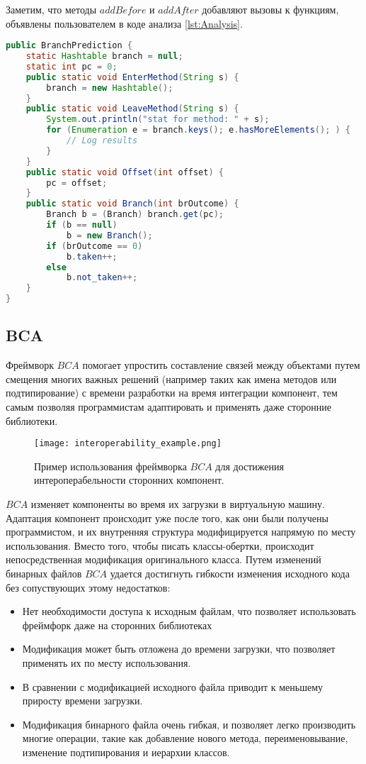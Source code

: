 Заметим, что методы $addBefore$ и $addAfter$ добавляют вызовы к функциям, объявлены пользователем в коде анализа \autoref{lst:Analysis}.

\begin{lstlisting}[language=Java, caption=Подсчет условных переходов на $BIT$. Код анализа, label=lst:Analysis]
public BranchPrediction {
    static Hashtable branch = null;
    static int pc = 0;
    public static void EnterMethod(String s) {
        branch = new Hashtable();
    }
    public static void LeaveMethod(String s) {
        System.out.println("stat for method: " + s);
        for (Enumeration e = branch.keys(); e.hasMoreElements(); ) {
            // Log results
        }
    }
    public static void Offset(int offset) {
        pc = offset;
    }
    public static void Branch(int brOutcome) {
        Branch b = (Branch) branch.get(pc);
        if (b == null)
            b = new Branch();
        if (brOutcome == 0)
            b.taken++;
        else
            b.not_taken++;
    }
}
\end{lstlisting}

\subsection{BCA}

Фреймворк $BCA$ помогает упростить составление связей между объектами путем смещения многих важных решений (например таких как имена методов или подтипирование) с времени разработки на время интеграции компонент, тем самым позволяя программистам адаптировать и применять даже сторонние библиотеки. 

\begin{figure}[h]
\centering
\texttt{[image: interoperability\_example.png]}
\caption{Пример использования фреймворка $BCA$ для достижения интероперабельности сторонних компонент.}
\label{fig:interopExample}
\end{figure}

$BCA$ изменяет компоненты во время их загрузки в виртуальную машину. Адаптация компонент происходит уже после того, как они были получены программистом, и их внутренняя структура модифицируется напрямую по месту использования. Вместо того, чтобы писать классы-обертки, происходит непосредственная модификация оригинального класса. Путем изменений бинарных файлов $BCA$ удается достигнуть гибкости изменения исходного кода без сопуствующих этому недостатков:

\begin{itemize}
    \item Нет необходимости доступа к исходным файлам, что позволяет использовать фреймфорк даже на сторонних библиотеках
    \item Модификация может быть отложена до времени загрузки, что позволяет применять их по месту использования.
    \item В сравнении с модификацией исходного файла приводит к меньшему приросту времени загрузки.
    \item Модификация бинарного файла очень гибкая, и позволяет легко производить многие операции, такие как добавление нового метода, переименовывание, изменение подтипирования и иерархии классов.
\end{itemize}


